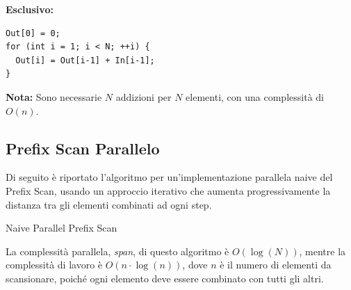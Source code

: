 \textbf{Esclusivo:}
\begin{lstlisting}
Out[0] = 0;
for (int i = 1; i < N; ++i) {
  Out[i] = Out[i-1] + In[i-1];
}
\end{lstlisting}
\textbf{Nota:} Sono necessarie $N$ addizioni per $N$ elementi,
con una complessità di $O(n)$.

\subsection{Prefix Scan Parallelo}

Di seguito è riportato l'algoritmo per un'implementazione parallela naive del
Prefix Scan, usando un approccio iterativo che aumenta progressivamente la
distanza tra gli elementi combinati ad ogni step.

\begin{algorithm}[H]
\caption{Naive Parallel Prefix Scan}
\label{alg:parallel_prefix_scan}
\end{algorithm}

La complessità parallela, \textit{span}, di questo algoritmo è $O(\log(N))$, 
mentre la complessità di lavoro è $O(n \cdot \log(n))$, dove $n$ è il numero di
elementi da scansionare, poiché ogni elemento deve essere combinato con tutti
gli altri.

